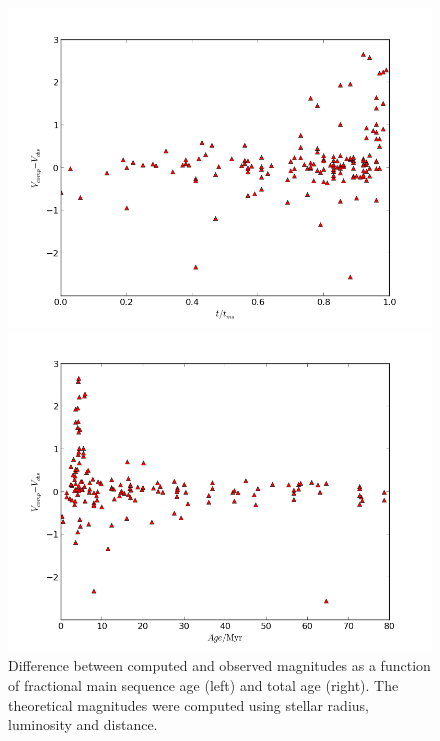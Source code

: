 \documentclass[a4paper,10pt]{article}
\begin{document}
 
  \begin{figure}[h!]
  \begin{minipage}{0.49\textwidth}
   \includegraphics[width=\textwidth]{diffmagfracms}
  \end{minipage}
  \begin{minipage}{0.49\textwidth}
   \includegraphics[width=\textwidth]{diffmagAge}
  \end{minipage}
 \caption{Difference between computed and observed magnitudes as a function of fractional main sequence age (left) and total age
 (right). The theoretical magnitudes were computed using stellar radius, luminosity and distance.\label{fracageage}}
 \end{figure}
 
\end{document}
